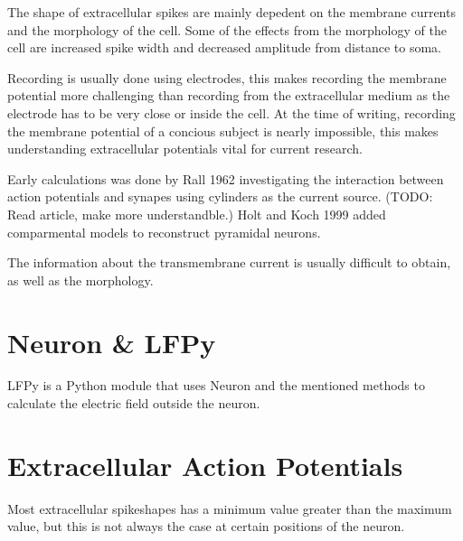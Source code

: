 \documentclass[altfont, fleqn]{uiophd}
\begin{document}
The shape of extracellular spikes are mainly depedent on the membrane currents
and the morphology of the cell. 
Some of the effects from the morphology of the cell are increased spike width and
decreased amplitude from distance to soma. 


Recording is usually done using electrodes, this makes recording the membrane potential
more challenging than recording from the extracellular medium as the electrode
has to be very close or inside the cell. 
At the time of writing,
recording the membrane potential of a concious subject is nearly impossible,
this makes understanding extracellular potentials vital for current research. 


Early calculations was done by Rall 1962 investigating 
the interaction between action potentials and synapes using cylinders
as the current source. (TODO: Read article, make more understandble.)
Holt and Koch 1999 added comparmental models to reconstruct pyramidal neurons. 

The information about the transmembrane current is usually difficult to obtain,
as well as the morphology.


\section{Neuron \& LFPy }
LFPy is a Python module that uses Neuron and the mentioned methods to calculate the 
electric field outside the neuron. 
\cite{linden_lfpy:_2013}

\section{Extracellular Action Potentials}
Most extracellular spikeshapes has a minimum value greater than the maximum 
value,
but this is not always the case at certain positions of the neuron. 
\end{document}
